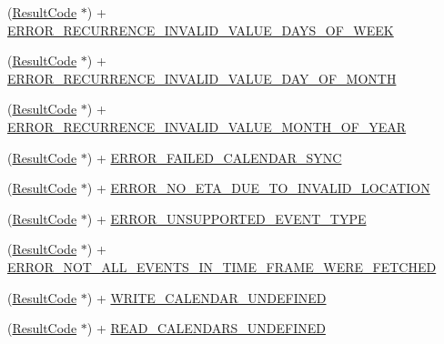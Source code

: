\begin{DoxyCompactItemize}
\item 
(\hyperlink{interface_result_code}{Result\+Code} $\ast$) + \hyperlink{interface_result_code_a6f1d63f9918153b72ca71c7748d635e4}{E\+R\+R\+O\+R\+\_\+\+R\+E\+C\+U\+R\+R\+E\+N\+C\+E\+\_\+\+I\+N\+V\+A\+L\+I\+D\+\_\+\+V\+A\+L\+U\+E\+\_\+\+D\+A\+Y\+S\+\_\+\+O\+F\+\_\+\+W\+E\+E\+K}
\item 
(\hyperlink{interface_result_code}{Result\+Code} $\ast$) + \hyperlink{interface_result_code_a909503814f03b507128498880bd1f901}{E\+R\+R\+O\+R\+\_\+\+R\+E\+C\+U\+R\+R\+E\+N\+C\+E\+\_\+\+I\+N\+V\+A\+L\+I\+D\+\_\+\+V\+A\+L\+U\+E\+\_\+\+D\+A\+Y\+\_\+\+O\+F\+\_\+\+M\+O\+N\+T\+H}
\item 
(\hyperlink{interface_result_code}{Result\+Code} $\ast$) + \hyperlink{interface_result_code_a67690ac53f653db4829e01ddc61d53b4}{E\+R\+R\+O\+R\+\_\+\+R\+E\+C\+U\+R\+R\+E\+N\+C\+E\+\_\+\+I\+N\+V\+A\+L\+I\+D\+\_\+\+V\+A\+L\+U\+E\+\_\+\+M\+O\+N\+T\+H\+\_\+\+O\+F\+\_\+\+Y\+E\+A\+R}
\item 
(\hyperlink{interface_result_code}{Result\+Code} $\ast$) + \hyperlink{interface_result_code_a4924a102ed6bd3602a5969eb04b5d921}{E\+R\+R\+O\+R\+\_\+\+F\+A\+I\+L\+E\+D\+\_\+\+C\+A\+L\+E\+N\+D\+A\+R\+\_\+\+S\+Y\+N\+C}
\item 
(\hyperlink{interface_result_code}{Result\+Code} $\ast$) + \hyperlink{interface_result_code_a2923cf657e464b8f5dcf224b0bc66c21}{E\+R\+R\+O\+R\+\_\+\+N\+O\+\_\+\+E\+T\+A\+\_\+\+D\+U\+E\+\_\+\+T\+O\+\_\+\+I\+N\+V\+A\+L\+I\+D\+\_\+\+L\+O\+C\+A\+T\+I\+O\+N}
\item 
(\hyperlink{interface_result_code}{Result\+Code} $\ast$) + \hyperlink{interface_result_code_a7e5660f5a6982628a31327cca479210b}{E\+R\+R\+O\+R\+\_\+\+U\+N\+S\+U\+P\+P\+O\+R\+T\+E\+D\+\_\+\+E\+V\+E\+N\+T\+\_\+\+T\+Y\+P\+E}
\item 
(\hyperlink{interface_result_code}{Result\+Code} $\ast$) + \hyperlink{interface_result_code_a66cf4647d5fe42c1e5c9a6679f6fbe7b}{E\+R\+R\+O\+R\+\_\+\+N\+O\+T\+\_\+\+A\+L\+L\+\_\+\+E\+V\+E\+N\+T\+S\+\_\+\+I\+N\+\_\+\+T\+I\+M\+E\+\_\+\+F\+R\+A\+M\+E\+\_\+\+W\+E\+R\+E\+\_\+\+F\+E\+T\+C\+H\+E\+D}
\item 
(\hyperlink{interface_result_code}{Result\+Code} $\ast$) + \hyperlink{interface_result_code_a4f1357caa79295c616652059be9a2c14}{W\+R\+I\+T\+E\+\_\+\+C\+A\+L\+E\+N\+D\+A\+R\+\_\+\+U\+N\+D\+E\+F\+I\+N\+E\+D}
\item 
(\hyperlink{interface_result_code}{Result\+Code} $\ast$) + \hyperlink{interface_result_code_a4e802ff5a307d6b43bbca26d922dd358}{R\+E\+A\+D\+\_\+\+C\+A\+L\+E\+N\+D\+A\+R\+S\+\_\+\+U\+N\+D\+E\+F\+I\+N\+E\+D}

\end{DoxyCompactItemize}
